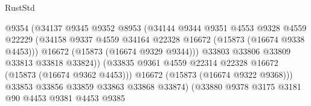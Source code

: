 \begin{lexlean}{RustStd}
\begin{coremodule}
                                          @9354
                                          (@34137
                                            @9345
                                            @9352
                                            @8953
                                            (@34144
                                              @9344
                                              @9351
                                              @4553
                                              @9328
                                              @4559
                                              @22229
                                              (@34158
                                                @9337
                                                @4559
                                                @34164
                                                @22328
                                                @16672
                                                (@15873 (@16674 @9338 @4453)))
                                              @16672
                                              (@15873 (@16674 @9329 @9344)))
                                            @33803
                                            @33806
                                            @33809
                                            @33813
                                            @33818
                                            @33824))
                                        (@33835
                                          @9361
                                          @4559
                                          @22314
                                          @22328
                                          @16672
                                          (@15873 (@16674 @9362 @4453)))
                                        @16672
                                        (@15873 (@16674 @9322 @9368)))
                                      @33853
                                      @33856
                                      @33859
                                      @33863
                                      @33868
                                      @33874)
                                    (@33880
                                      @9378
                                      @3175
                                      @3181
                                      @90
                                      @4453
                                      @9381
                                      @4453
                                      @9385

\end{coremodule}
\end{lexlean}
